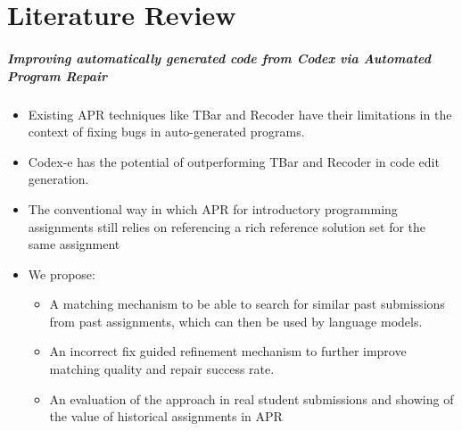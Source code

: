 \chapter{Literature Review}

%

\paragraph{Improving automatically generated code from Codex via Automated Program Repair}

\begin{itemize}
    \item Existing APR techniques like TBar and Recoder have their limitations in the context of
          fixing bugs in auto-generated programs.
    \item Codex-e has the potential of outperforming TBar and Recoder in code edit generation.
    \item The conventional way in which APR for introductory programming assignments still relies
          on referencing a rich reference solution set for the same assignment
    \item We propose:
    \begin{itemize}
        \item A matching mechanism to be able to search for similar past submissions from past
              assignments, which can then be used by language models.
        \item An incorrect fix guided refinement mechanism to further improve matching quality
              and repair success rate.
        \item An evaluation of the approach in real student submissions and showing of the value
              of historical assignments in APR
    \end{itemize}
\end{itemize}